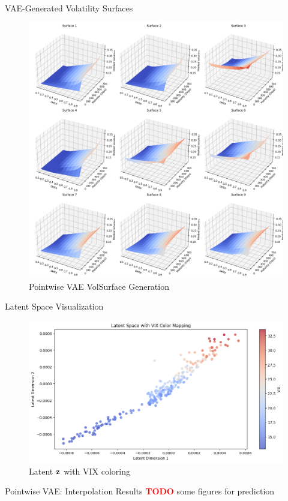 \documentclass{beamer}
\newcommand\todo{\textcolor{red}{\textbf{TODO}}}
\begin{document}
\begin{frame}{VAE-Generated Volatility Surfaces}
\begin{figure}
    \centering
    \includegraphics[width=0.65\linewidth]{docs/slides/img/vae_pw_ii_plot_from_5.png}
    \caption{Pointwise VAE VolSurface Generation}
    \label{fig:enter-label}
\end{figure}
\end{frame}

\begin{frame}{Latent Space Visualization}
\begin{figure}
    \centering
    \includegraphics[width=0.8\linewidth]{docs/slides/img/latent.png}
    \caption{Latent $\bf{z}$ with VIX coloring}
    \label{fig:enter-label}
\end{figure}
\end{frame}

\begin{frame}{Pointwise VAE: Interpolation Results}
\todo
some figures for prediction

\end{frame}
\end{document}
